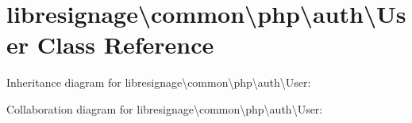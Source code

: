 \hypertarget{classlibresignage_1_1common_1_1php_1_1auth_1_1User}{}\section{libresignage\textbackslash{}common\textbackslash{}php\textbackslash{}auth\textbackslash{}User Class Reference}
\label{classlibresignage_1_1common_1_1php_1_1auth_1_1User}


Inheritance diagram for libresignage\textbackslash{}common\textbackslash{}php\textbackslash{}auth\textbackslash{}User\+:


Collaboration diagram for libresignage\textbackslash{}common\textbackslash{}php\textbackslash{}auth\textbackslash{}User\+:
